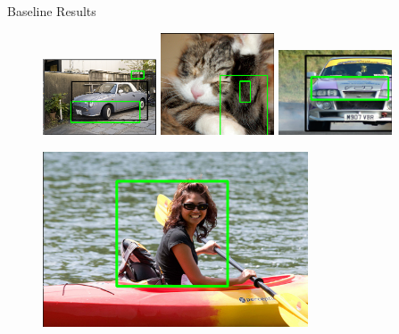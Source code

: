 \documentclass[compress,aspectratio=43]{beamer}
\begin{document}
\begin{frame}{Baseline Results}
{\begin{figure}
		\vspace{3mm}
		\includegraphics[width=0.3\textwidth]{figures/baseline/example4.png}
		\hspace{2mm}
		\includegraphics[width=0.3\textwidth]{figures/baseline/example5.png}
		\hspace{2mm}
		\includegraphics[width=0.3\textwidth]{figures/baseline/example6_cropped.png}
	\end{figure}
}
 {
    \begin{figure}
		\centering
		\includegraphics[width=0.7\textwidth]{figures/baseline/example7.png}
	\end{figure}
}
\end{frame}
\end{document}
